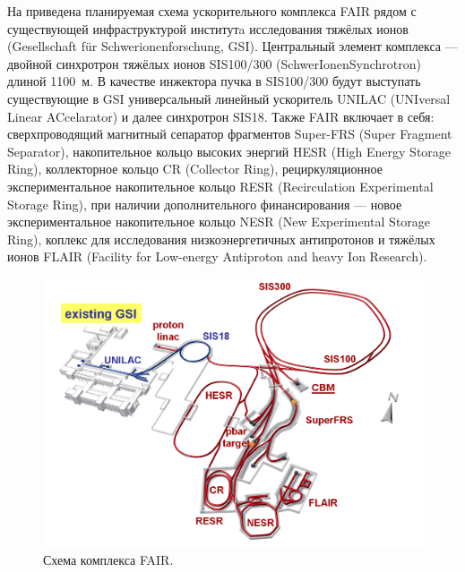 На  приведена планируемая схема ускорительного комплекса FAIR рядом с существующей инфраструктурой институтa исследования тяжёлых ионов (Gesellschaft f\"{u}r Schwerionenforschung, GSI).
Центральный элемент комплекса --- двойной синхротрон тяжёлых ионов SIS100/300 (SchwerIonenSynchrotron) длиной 1100~м. В качестве инжектора пучка в SIS100/300 будут выступать существующие в GSI универсальный линейный ускоритель UNILAC (UNIversal Linear ACcelarator) и далее синхротрон SIS18.
Также FAIR включает в себя:
сверхпроводящий магнитный сепаратор фрагментов Super-FRS (Super Fragment Separator),
накопительное кольцо высоких энергий HESR (High Energy Storage Ring),
коллекторное кольцо CR (Collector Ring),
рециркуляционное экспериментальное накопительное кольцо RESR (Recirculation Experimental Storage Ring), 
при наличии дополнительного финансирования --- новое экспериментальное накопительное кольцо NESR (New Experimental Storage Ring),
коплекс для исследования низкоэнергетичных антипротонов и тяжёлых ионов FLAIR (Facility for Low-energy Antiproton and heavy Ion Research).

\begin{figure}[H]
\includegraphics[width=1.0\textwidth]{pictures/FAIR_structure.png}
\caption{Схема комплекса FAIR.}
\label{fig:FAIRstructure}
\end{figure}

